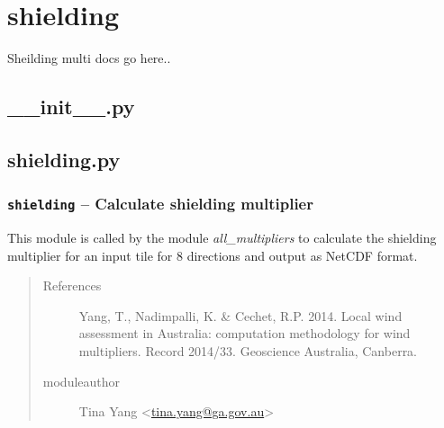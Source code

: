 \documentclass[letterpaper,10pt,english]{sphinxmanual}
\begin{document}
\section{shielding}
\label{docs/shielding:shielding}\label{docs/shielding::doc}
Sheilding multi docs go here..


\subsection{\_\_init\_\_.py}
\label{docs/shielding:init-py}\label{docs/shielding:module-__init__}

\subsection{shielding.py}
\label{docs/shielding:module-shield_mult}\label{docs/shielding:shielding-py}

\subsubsection{\texttt{shielding} -- Calculate shielding multiplier}
\label{docs/shielding:shielding-calculate-shielding-multiplier}
This module is called by the module
\emph{all\_multipliers} to calculate the shielding multiplier for an input tile
for 8 directions and output as NetCDF format.
\begin{quote}\begin{description}
\item[{References}] \leavevmode
Yang, T., Nadimpalli, K. \& Cechet, R.P. 2014. Local wind assessment
in Australia: computation methodology for wind multipliers. Record 2014/33.
Geoscience Australia, Canberra.

\item[{moduleauthor}] \leavevmode
Tina Yang \textless{}\href{mailto:tina.yang@ga.gov.au}{tina.yang@ga.gov.au}\textgreater{}

\end{description}\end{quote}

\end{document}

